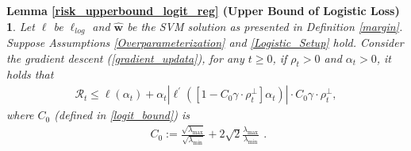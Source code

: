 \documentclass[pdflatex,sn-basic]{sn-jnl}%
\theoremstyle{thmstyleone}%
\begin{document}
\begin{appendices}
\newtheorem*{restate_risk_upperbound_logit_reg}{Lemma \ref{risk_upperbound_logit_reg} (Upper Bound of Logistic Loss)}
\begin{shaded}
\begin{restate_risk_upperbound_logit_reg}
  Let $\ell$ be $\ell_{log}$ and $\hat{\mathbf{w}}$ be the SVM solution as presented in Definition \ref{margin}. 
  Suppose Assumptions \ref{Overparameterization} and \ref{Logistic_Setup} hold.
  Consider the gradient descent (\ref{gradient_updata}), for any $t \ge 0$, 
  if $\rho_t > 0$ and $\alpha_t > 0$, it holds that 
  \begin{equation*}
  \begin{aligned}
    \mathcal{R}_t \le 
    \ell \left(\alpha_t\right) +
    \alpha_t \left| \ell^{\prime} \left(
        \left[ 1 -  C_0 \gamma \cdot \rho_t^{\perp} \right] \alpha_t
      \right)
    \right|
    \cdot C_0 \gamma \cdot \rho_t^{\perp},
  \end{aligned}
  \end{equation*}
  where $C_0$ (defined in \ref{logit_bound}) is 
  \begin{equation*}
  \begin{aligned}
    C_0 := \frac{\sqrt{\lambda_{\max}}}{\sqrt{\lambda_{\min} }} + 2 \sqrt{2} \frac{\lambda_{\max} }{\lambda_{\min}}
  \end{aligned}.
  \end{equation*}
\end{restate_risk_upperbound_logit_reg}
\end{shaded}


\end{appendices}
\end{document}
